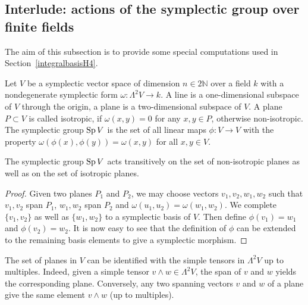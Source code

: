 \subsection{Interlude: actions of the symplectic group over finite fields}\label{Section_Symplectic}
The aim of this subsection is to provide some special computations used in Section~\ref{integralbasisH4}.

Let $V$ be a symplectic vector space of dimension $n\in 2\mathbb{N}$ over a field $k$ with a nondegenerate symplectic form $\omega : \Lambda^2 V \rightarrow k$. A line is a one-dimensional subspace of $V$ through the origin, a plane is a two-dimensional subspace of $V$. A plane $P\subset V$ is called isotropic, if $\omega (x,y)=0$ for any $x,y\in P$, otherwise non-isotropic.  The symplectic group $\operatorname{Sp} V$ is the set of all linear maps $\phi : V\rightarrow V$ with the property $\omega(\phi(x),\phi(y)) = \omega(x,y)$ for all $ x,y\in V$.
\begin{proposition}\label{transitively}
The symplectic group $\operatorname{Sp} V$ acts transitively on the set of non-isotropic planes as well as on the set of isotropic planes.
\end{proposition}
\begin{proof}
Given two planes $P_1$ and $P_2$, we may choose vectors $v_1,v_2,w_1,w_2$ such that $v_1,v_2$ span $P_1$, $w_1,w_2$ span $P_2$ and $\omega(u_1,u_2) =\omega(w_1,w_2)$. We complete $\{v_1,v_2\}$ as well as $\{w_1,w_2\}$ to a symplectic basis of $V$.
Then define $\phi(v_1)=w_1$ and $\phi(v_2)=w_2$. 
It is now easy to see that the definition of $\phi$ can be extended to the remaining basis elements to give a symplectic morphism.
\end{proof}
\begin{remark} \label{simplePlanes}
The set of planes in $V$ can be identified with the simple tensors in $\Lambda^2V$ up to multiples. Indeed, given a simple tensor $v\wedge w \in \Lambda^2 V$, the span of $v$ and $w$ yields the corresponding plane. Conversely, any two spanning vectors $v$ and $w$ of a plane give the same element $v\wedge w$ (up to multiples).
\end{remark}

